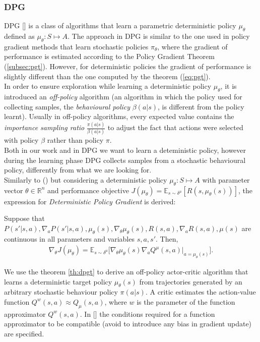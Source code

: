 \subsubsection{DPG} \label{subsec:dpg}
\acf{DPG} [\citet{article}] is a class of algorithms that learn a parametric deterministic policy $\mu_{\theta}$ defined as $\mu_{\theta}: S \mapsto A$. The approach in \ac{DPG} is similar to the one used in policy gradient methods that learn stochastic policies $\pi_{\theta}$, where the gradient of performance is estimated according to the Policy Gradient Theorem (\ref{subsec:pgt}). However, for deterministic policies the gradient of performance is slightly different than the one computed by the theorem (\ref{eq:pgt}).\\
\newline
In order to ensure exploration while learning a deterministic policy $\mu_{\theta}$, it is introduced an \emph{off-policy} algorithm (\ie an algorithm in which the policy used for collecting samples, the \emph{behavioural policy} $\beta(a|s)$, is different from the policy learnt). Usually in off-policy algorithms, every expected value contains the \emph{importance sampling ratio} $\frac{\pi(a|s)}{\beta(a|s)}$ to adjust the fact that actions were selected with policy $\beta$ rather than policy $\pi$.\\
\newline
Both in our work and in \ac{DPG} we want to learn a deteministic policy, however during the learning phase \ac{DPG} collects samples from a stochastic behavioural policy, differently from what we are looking for.\\
\newline
Similarly to () but considering a deterministic policy $\mu_{\theta}: S \mapsto A$ with parameter vector $\theta \in \mathbb{R}^n$ and performance objective $J(\mu_{\theta}) = \mathbb{E}_{s \sim \delta^{\mu}}[R(s, \mu_{\theta}(s))]$, the expression for \emph{Deterministic Policy Gradient} is derived:
\begin{theorem} \label{th:dpgt}
	Suppose that $P(s'|s,a), \nabla_aP(s'|s,a), \mu_{\theta}(s), \nabla_{\theta} \mu_{\theta}(s), R(s,a), \nabla_a R(s,a), \mu(s)$  are continuous in all parameters and variables $s, a, s'$. Then, 
	\begin{align}
	\nabla_{\theta}J(\mu_{\theta}) = \mathbb{E}_{s \sim \delta^{\mu}} \Big[\nabla_{\theta} \mu_{\theta} (s) \nabla_a Q^{\mu}(s,a)|_{a = \mu_{\theta} (s)}\Big].
	\end{align}
\end{theorem}
\noindent We use the theorem \ref{th:dpgt} to derive an off-policy actor-critic algorithm that learns a deterministic target policy $\mu_{\theta}(s)$ from trajectories generated by an arbitrary stochastic behaviour policy $\pi(a|s)$. A critic estimates the action-value function $Q^w(s,a) \approx Q_{\mu}(s,a)$, where $w$ is the parameter of the function approximator $Q^w(s,a)$. In [\citet{article}] the conditions required for a function approximator to be compatible (\ie avoid to introduce any bias in gradient update) are specified.


